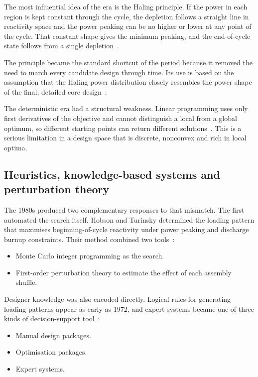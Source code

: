 The most influential idea of the era is the Haling principle. If the
power in each region is kept constant through the cycle, the depletion
follows a straight line in reactivity space and the power peaking can be
no higher or lower at any point of the cycle. That constant shape gives
the minimum peaking, and the end-of-cycle state follows from a single
depletion~\cite{downar_1988}.

The principle became the standard shortcut of the period because it
removed the need to march every candidate design through time. Its use
is based on the assumption that the Haling power distribution closely
resembles the power shape of the final, detailed core
design~\cite{downar_1988}.

The deterministic era had a structural weakness. Linear programming
uses only first derivatives of the objective and cannot distinguish a
local from a global optimum, so different starting points can return
different solutions~\cite{downar_1988}. This is a serious limitation in
a design space that is discrete, nonconvex and rich in local optima.

\subsection{Heuristics, knowledge-based systems and perturbation
theory}
\label{sec:lit-opt-heuristic}

The 1980s produced two complementary responses to that mismatch. The
first automated the search itself. Hobson and Turinsky determined
the loading pattern that maximises beginning-of-cycle reactivity under
power peaking and discharge burnup constraints. Their method combined
two tools~\cite{hobson_turinsky_1986}:

\begin{itemize}
  \item Monte Carlo integer programming as the search.

  \item First-order perturbation theory to estimate the effect of each
        assembly shuffle.
\end{itemize}

Designer knowledge was also encoded directly. Logical rules for
generating loading patterns appear as early as 1972, and expert systems
became one of three kinds of decision-support
tool~\cite{meneses_2010}:

\begin{itemize}
  \item Manual design packages.

  \item Optimisation packages.

  \item Expert systems.
\end{itemize}

